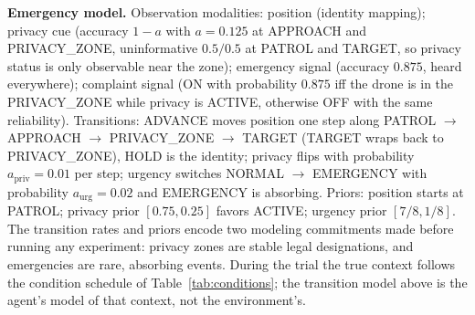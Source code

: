 \documentclass[10pt,twocolumn]{article}
\begin{document}
\begin{table}[H]
\centering
\scriptsize
{}
\caption{Hidden-state factorization of the three generative models. The emergency model is also the substrate for the ablation, baseline, sensitivity, noise, and learning experiments (Sections~5.5--5.9). Controllable factors have 2 actions (HOLD/ADVANCE) in the emergency and minimization models and 3 (STAY/ADVANCE/RETREAT) in the geofence model.}
\label{tab:app-factors}
\end{table}

\textbf{Emergency model.} Observation modalities: position (identity mapping); privacy cue (accuracy $1-a$ with $a = 0.125$ at APPROACH and PRIVACY\_ZONE, uninformative $0.5/0.5$ at PATROL and TARGET, so privacy status is only observable near the zone); emergency signal (accuracy $0.875$, heard everywhere); complaint signal (ON with probability $0.875$ iff the drone is in the PRIVACY\_ZONE while privacy is ACTIVE, otherwise OFF with the same reliability). Transitions: ADVANCE moves position one step along PATROL $\to$ APPROACH $\to$ PRIVACY\_ZONE $\to$ TARGET (TARGET wraps back to PRIVACY\_ZONE), HOLD is the identity; privacy flips with probability $a_{\text{priv}} = 0.01$ per step; urgency switches NORMAL $\to$ EMERGENCY with probability $a_{\text{urg}} = 0.02$ and EMERGENCY is absorbing. Priors: position starts at PATROL; privacy prior $[0.75, 0.25]$ favors ACTIVE; urgency prior $[7/8, 1/8]$. The transition rates and priors encode two modeling commitments made before running any experiment: privacy zones are stable legal designations, and emergencies are rare, absorbing events. During the trial the true context follows the condition schedule of Table~\ref{tab:conditions}; the transition model above is the agent's model of that context, not the environment's.
\end{document}
